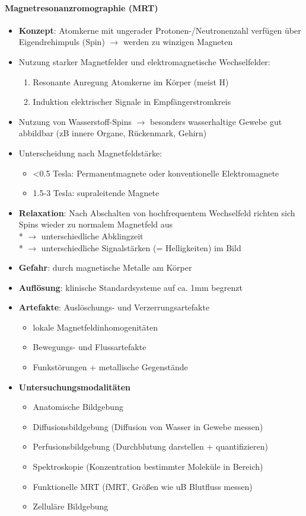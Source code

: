 \paragraph{Magnetresonanzromographie (MRT)}
\begin{itemize}
  \item \textbf{Konzept}: Atomkerne mit ungerader Protonen-/Neutronenzahl verfügen über Eigendrehimpuls (Spin) \( \to \) werden zu winzigen Magneten
  \item Nutzung starker Magnetfelder und elektromagnetische Wechselfelder:
  \begin{enumerate}
    \item Resonante Anregung Atomkerne im Körper (meist H)
    \item Induktion elektrischer Signale in Empfängerstromkreis
  \end{enumerate}
  \item Nutzung von Wasserstoff-Spins \( \to \) besonders wasserhaltige Gewebe gut abbildbar (zB innere Organe, Rückenmark, Gehirn)
  \item Unterscheidung nach Magnetfeldstärke:
  \begin{itemize}
    \item <0.5 Tesla: Permanentmagnete oder konventionelle Elektromagnete
    \item 1.5-3 Tesla: supraleitende Magnete
  \end{itemize}
  \item \textbf{Relaxation}: Nach Abschalten von hochfrequentem Wechselfeld richten sich Spins wieder zu normalem Magnetfeld aus \\* \( \to \) unterschiedliche Abklingzeit \\* \( \to \) unterschiedliche Signalstärken (= Helligkeiten) im Bild
  \item \textbf{Gefahr}: durch magnetische Metalle am Körper
  \item \textbf{Auflösung}: klinische Standardsysteme auf ca. 1mm begrenzt
  \item \textbf{Artefakte}: Auslöschungs- und Verzerrungsartefakte
  \begin{itemize}
      \item lokale Magnetfeldinhomogenitäten
      \item Bewegungs- und Flussartefakte
      \item Funkstörungen + metallische Gegenstände
  \end{itemize}
  \item \textbf{Untersuchungsmodalitäten}
  \begin{itemize}
    \item Anatomische Bildgebung
    \item Diffusionsbildgebung (Diffusion von Wasser in Gewebe messen)
    \item Perfusionsbildgebung (Durchblutung darstellen + quantifizieren)
    \item Spektroskopie (Konzentration bestimmter Moleküle in Bereich)
    \item Funktionelle MRT (fMRT, Größen wie uB Blutfluss messen)
    \item Zelluläre Bildgebung
  \end{itemize}
\end{itemize}

